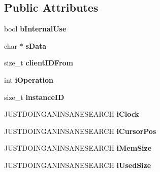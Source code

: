 \subsection*{Public Attributes}
\begin{DoxyCompactItemize}
\item 
\hypertarget{classcl_packet_a1308b1f63f238eb51451e63e8b0ee3cf}{
bool {\bfseries bInternalUse}}
\label{classcl_packet_a1308b1f63f238eb51451e63e8b0ee3cf}

\item 
\hypertarget{classcl_packet_a17c4f61e64b67a30e6cab3e8638c21bf}{
char $\ast$ {\bfseries sData}}
\label{classcl_packet_a17c4f61e64b67a30e6cab3e8638c21bf}

\item 
\hypertarget{classcl_packet_a1b5f234d3071d126f82c371afb5c6ad1}{
size\_\-t {\bfseries clientIDFrom}}
\label{classcl_packet_a1b5f234d3071d126f82c371afb5c6ad1}

\item 
\hypertarget{classcl_packet_a26a9df3663e7ba2841184e69cedb0b06}{
int {\bfseries iOperation}}
\label{classcl_packet_a26a9df3663e7ba2841184e69cedb0b06}

\item 
\hypertarget{classcl_packet_aaa5d80a73442de14552e0f7ca83973a9}{
size\_\-t {\bfseries instanceID}}
\label{classcl_packet_aaa5d80a73442de14552e0f7ca83973a9}

\item 
\hypertarget{classcl_packet_a561c1b3e7402d1f0adf6f72c0bccb9f7}{
JUSTDOINGANINSANESEARCH {\bfseries iClock}}
\label{classcl_packet_a561c1b3e7402d1f0adf6f72c0bccb9f7}

\item 
\hypertarget{classcl_packet_a0e95c1b489dadcd5d06925dcac367269}{
JUSTDOINGANINSANESEARCH {\bfseries iCursorPos}}
\label{classcl_packet_a0e95c1b489dadcd5d06925dcac367269}

\item 
\hypertarget{classcl_packet_aba75e4b9a0128212eca092ff16fc6177}{
JUSTDOINGANINSANESEARCH {\bfseries iMemSize}}
\label{classcl_packet_aba75e4b9a0128212eca092ff16fc6177}

\item 
\hypertarget{classcl_packet_a70a3d397df8edfbf02a5ca3f9be34fd8}{
JUSTDOINGANINSANESEARCH {\bfseries iUsedSize}}
\label{classcl_packet_a70a3d397df8edfbf02a5ca3f9be34fd8}

\end{DoxyCompactItemize}
